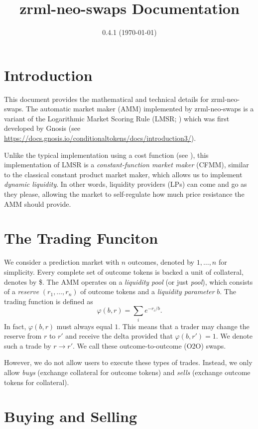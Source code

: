 \documentclass[12pt]{article}
\title{zrml-neo-swaps Documentation}
\date{0.4.1 (\today)}
\begin{document}
\maketitle

\section{Introduction}

This document provides the mathematical and technical details for zrml-neo-swaps. The automatic market maker (AMM) implemented by zrml-neo-swaps is a variant of the Logarithmic Market Scoring Rule (LMSR; \cite{rh}) which was first developed by Gnosis (see \url{https://docs.gnosis.io/conditionaltokens/docs/introduction3/}).

Unlike the typical implementation using a cost function (see \cite{chen-vaughan}), this implementation of LMSR is a \emph{constant-function market maker} (CFMM), similar to the classical constant product market maker, which allows us to implement \emph{dynamic liquidity}. In other words, liquidity providers (LPs) can come and go as they please, allowing the market to self-regulate how much price resistance the AMM should provide.

\section{The Trading Funciton}

We consider a prediction market with $n$ outcomes, denoted by $1, \ldots, n$ for simplicity. Every complete set of outcome tokens is backed a unit of collateral, denotes by \$. The AMM operates on a \emph{liquidity pool} (or just \emph{pool}), which consists of a \emph{reserve} $(r_1, \ldots, r_n)$ of outcome tokens and a \emph{liquidity parameter} $b$. The trading function is defined as
\[
    \varphi(b, r) = \sum_i e^{-r_i/b}.
\]
In fact, $\varphi(b, r)$ must always equal $1$. This means that a trader may change the reserve from $r$ to $r'$ and receive the delta provided that $\varphi(b, r') = 1$. We denote such a trade by $r \rightarrow r'$. We call these outcome-to-outcome (O2O) swaps.

However, we do not allow users to execute these types of trades. Instead, we only allow \emph{buys} (exchange collateral for outcome tokens) and \emph{sells} (exchange outcome tokens for collateral).

\section{Buying and Selling}
\end{document}
